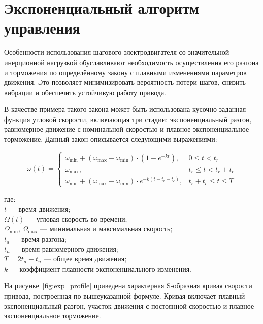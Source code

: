 \section{Экспоненциальный алгоритм управления}\label{sec:ch2/sec3}

Особенности использования шагового электродвигателя со значительной инерционной нагрузкой обуславливают необходимость осуществления его разгона и торможения по определённому закону с плавными изменениями параметров движения. Это позволяет минимизировать вероятность потери шагов, снизить вибрации и обеспечить устойчивую работу привода.

В качестве примера такого закона может быть использована кусочно-заданная функция угловой скорости, включающая три стадии: экспоненциальный разгон, равномерное движение с номинальной скоростью и плавное экспоненциальное торможение. Данный закон описывается следующими выражениями:

\begin{samepage}
\begin{equation}
	\label{eq:expOmega}
	\omega(t) =
	\begin{cases}
		\omega_{\min} + (\omega_{\max} - \omega_{\min}) \cdot \left(1 - e^{-k t} \right),
		& 0 \leq t < t_r \\
		\omega_{\max}, 
		& t_r \leq t < t_r + t_c \\
		\omega_{\min} + (\omega_{\max} - \omega_{\min}) \cdot e^{-k (t - t_r - t_c)},
		& t_r + t_c \leq t \leq T
	\end{cases}
\end{equation}

где: \\
\quad $t$ — время движения; \\
\quad $\Omega(t)$ — угловая скорость во времени; \\
\quad $\Omega_{\min}$, $\Omega_{\max}$ — минимальная и максимальная скорость; \\
\quad $t_a$ — время разгона; \\
\quad $t_n$ — время равномерного движения; \\
\quad $T = 2t_a + t_n$ — общее время движения; \\
\quad $k$ — коэффициент плавности экспоненциального изменения.
\end{samepage}


На рисунке~\ref{fig:exp_profile} приведена характерная S-образная кривая скорости привода, построенная по вышеуказанной формуле. Кривая включает плавный экспоненциальный разгон, участок движения с постоянной скоростью и плавное экспоненциальное торможение.

